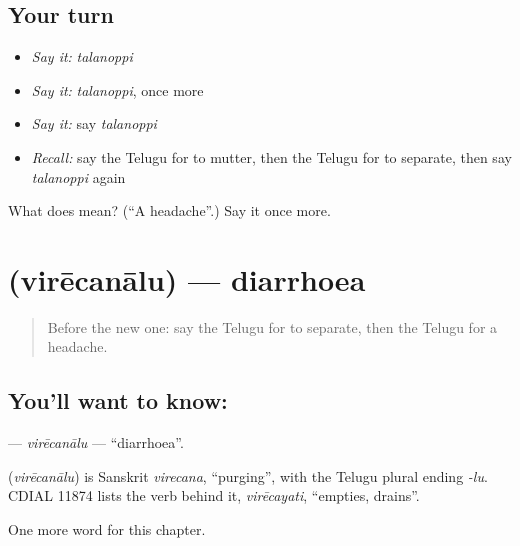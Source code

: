 \subsection*{Your turn}
\begin{itemize}
\raggedright
  \item \emph{Say it:} \emph{talanoppi}
  \item \emph{Say it:} \emph{talanoppi}, once more
  \item \emph{Say it:} say \emph{talanoppi}
  \item \emph{Recall:} say the Telugu for to mutter, then the Telugu for to separate, then say \emph{talanoppi} again
\end{itemize}

\begin{tcolorbox}[breakable,colback=teal!4,colframe=teal!35!black,title={Before you move on}]
What does  mean? (\textquotedblleft{}A headache\textquotedblright{}.) Say it once more.
\end{tcolorbox}
\section[\texorpdfstring{\te{విరేచనాలు} (virēcanālu)}{విరేచనాలు (virēcanālu)}]{ (virēcanālu) — diarrhoea}

\label{lesson:TE-C167-virecanalu}



\begin{quote}
Before the new one: say the Telugu for to separate, then the Telugu for a headache.
\end{quote}

\subsection*{You'll want to know: }
\textbf{} — \emph{virēcanālu} — \textquotedblleft{}diarrhoea\textquotedblright{}.

\begin{cousinweb}
\textbf{} (\emph{virēcanālu}) is Sanskrit \emph{virecana}, \textquotedblleft{}purging\textquotedblright{}, with the Telugu plural ending \emph{-lu}. CDIAL 11874 lists the verb behind it, \emph{virēcayati}, \textquotedblleft{}empties, drains\textquotedblright{}.
\end{cousinweb}

\begin{grammarlens}[title={What you've built}]
One more word for this chapter.
\end{grammarlens}

